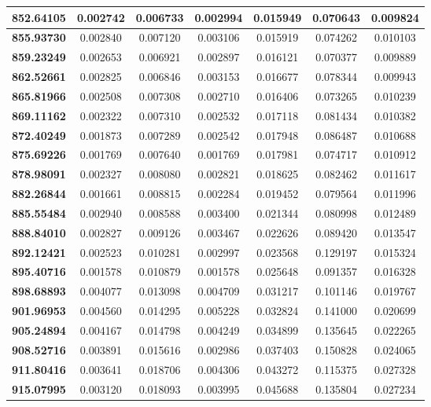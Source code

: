 \documentclass[11pt]{article}
\begin{document}
\begin{appendices}
\begin{longtable}{|c|c|c|c|c|c|c|}
	\textbf{852.64105} & 0.002742 & 0.006733 & 0.002994 & 0.015949 & 0.070643 & 0.009824 \\ \hline
	\textbf{855.93730} & 0.002840 & 0.007120 & 0.003106 & 0.015919 & 0.074262 & 0.010103 \\ \hline
	\textbf{859.23249} & 0.002653 & 0.006921 & 0.002897 & 0.016121 & 0.070377 & 0.009889 \\ \hline
	\textbf{862.52661} & 0.002825 & 0.006846 & 0.003153 & 0.016677 & 0.078344 & 0.009943 \\ \hline
	\textbf{865.81966} & 0.002508 & 0.007308 & 0.002710 & 0.016406 & 0.073265 & 0.010239 \\ \hline
	\textbf{869.11162} & 0.002322 & 0.007310 & 0.002532 & 0.017118 & 0.081434 & 0.010382 \\ \hline
	\textbf{872.40249} & 0.001873 & 0.007289 & 0.002542 & 0.017948 & 0.086487 & 0.010688 \\ \hline
	\textbf{875.69226} & 0.001769 & 0.007640 & 0.001769 & 0.017981 & 0.074717 & 0.010912 \\ \hline
	\textbf{878.98091} & 0.002327 & 0.008080 & 0.002821 & 0.018625 & 0.082462 & 0.011617 \\ \hline
	\textbf{882.26844} & 0.001661 & 0.008815 & 0.002284 & 0.019452 & 0.079564 & 0.011996 \\ \hline
	\textbf{885.55484} & 0.002940 & 0.008588 & 0.003400 & 0.021344 & 0.080998 & 0.012489 \\ \hline
	\textbf{888.84010} & 0.002827 & 0.009126 & 0.003467 & 0.022626 & 0.089420 & 0.013547 \\ \hline
	\textbf{892.12421} & 0.002523 & 0.010281 & 0.002997 & 0.023568 & 0.129197 & 0.015324 \\ \hline
	\textbf{895.40716} & 0.001578 & 0.010879 & 0.001578 & 0.025648 & 0.091357 & 0.016328 \\ \hline
	\textbf{898.68893} & 0.004077 & 0.013098 & 0.004709 & 0.031217 & 0.101146 & 0.019767 \\ \hline
	\textbf{901.96953} & 0.004560 & 0.014295 & 0.005228 & 0.032824 & 0.141000 & 0.020699 \\ \hline
	\textbf{905.24894} & 0.004167 & 0.014798 & 0.004249 & 0.034899 & 0.135645 & 0.022265 \\ \hline
	\textbf{908.52716} & 0.003891 & 0.015616 & 0.002986 & 0.037403 & 0.150828 & 0.024065 \\ \hline
	\textbf{911.80416} & 0.003641 & 0.018706 & 0.004306 & 0.043272 & 0.115375 & 0.027328 \\ \hline
	\textbf{915.07995} & 0.003120 & 0.018093 & 0.003995 & 0.045688 & 0.135804 & 0.027234 \\ \hline

\end{longtable}
\end{appendices}
\end{document}
